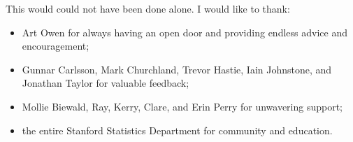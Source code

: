 
This would could not have been done alone.  I would like to thank:
\begin{itemize}
    \item Art Owen for always having an open door and providing
        endless advice and encouragement;
    \item Gunnar Carlsson, Mark Churchland, Trevor Hastie, Iain Johnstone, 
        and Jonathan Taylor for valuable feedback;
    \item Mollie Biewald, Ray, Kerry, Clare, and Erin Perry for
        unwavering support;
    \item the entire Stanford Statistics Department for community and
        education.
\end{itemize}

